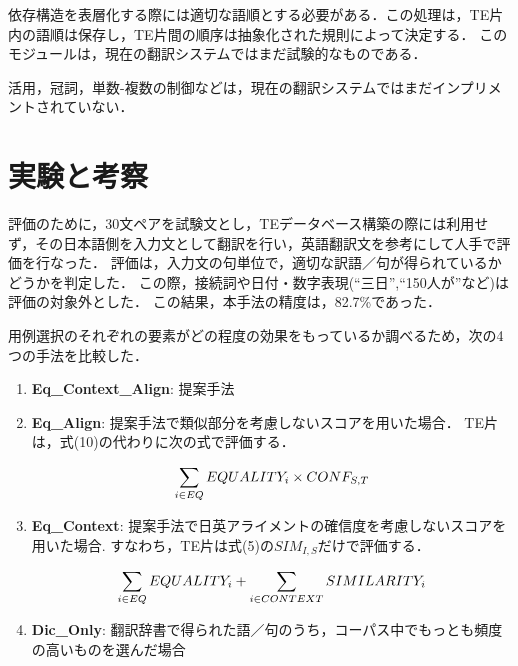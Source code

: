 \documentclass{nlp}
\begin{document}
依存構造を表層化する際には適切な語順とする必要がある．この処理は，TE片内の語順は保存し，TE片間の順序は抽象化された規則によって決定する．
このモジュールは，現在の翻訳システムではまだ試験的なものである．

活用，冠詞，単数-複数の制御などは，現在の翻訳システムではまだインプリメントされていない．

\section{実験と考察}

評価のために，30文ペアを試験文とし，TEデータベース構築の際には利用せず，その日本語側を入力文として翻訳を行い，英語翻訳文を参考にして人手で評価を行なった．
評価は，入力文の句単位で，適切な訳語／句が得られているかどうかを判定した．
この際，接続詞や日付・数字表現(``三日'',``150人が''など)は評価の対象外とした．
この結果，本手法の精度は，82.7\%であった．

用例選択のそれぞれの要素がどの程度の効果をもっているか調べるため，次の4つの手法を比較した．

\begin{enumerate}
\item \textbf{{\sc Eq\_Context\_Align}}: 提案手法

\item \textbf{{\sc Eq\_Align}}: 提案手法で類似部分を考慮しないスコアを用いた場合．
TE片は，式(10)の代わりに次の式で評価する．

\begin{equation}
 \sum_{i \in EQ}EQUALITY_i \times CONF_{S,T} \\
\end{equation}

\item \textbf{{\sc Eq\_Context}}: 提案手法で日英アライメントの確信度を考慮しないスコアを用いた場合.
すなわち，TE片は式(5)の$SIM_{I,S}$だけで評価する．

\begin{equation}
\sum_{i \in EQ}EQUALITY_i + \sum_{i \in CONTEXT}SIMILARITY_i \\
\end{equation}

\item \textbf{{\sc Dic\_Only}}: 翻訳辞書で得られた語／句のうち，コーパス中でもっとも頻度の高いものを選んだ場合
\end{enumerate}

\vspace{1ex}
\end{document}
